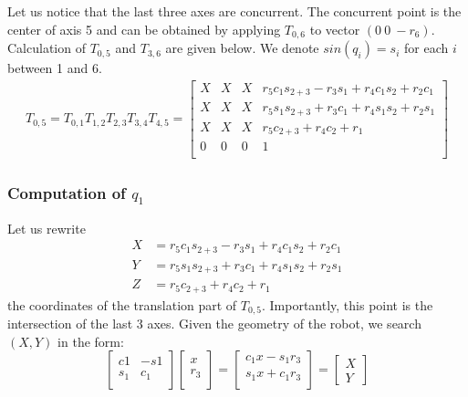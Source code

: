 \documentclass{article}
\begin{document}
Let us notice that the last three axes are concurrent. The concurrent point is the center of axis 5 and can be obtained by applying $T_{0,6}$ to vector $\left(0\ 0\ -r_6\right)$.
Calculation of  $T_{0,5}$ and $T_{3,6}$ are given below. We denote $sin(q_i)=s_i$  for each $i$ between 1 and 6.
\begin{align*}
T_{0,5} = T_{0,1} T_{1,2} T_{2,3} T_{3,4} T_{4,5} =
\begin{bmatrix}
  X & X & X &r_5c_1s_{2+3}-r_3s_1+r_4c_1s_2+r_2c_1\\
  X & X & X & r_5s_1s_{2+3}+r_3c_1+r_4s_1s_2+r_2s_1 \\
  X & X & X & r_5c_{2+3}+r_4c_2+r_1 \\
  0 & 0 & 0 & 1 \\
\end{bmatrix}
\end{align*}

\subsubsection*{Computation of $q_1$}

Let us rewrite
\begin{align*}
  X&=r_5c_1s_{2+3}-r_3s_1+r_4c_1s_2+r_2c_1\\
  Y&=r_5s_1s_{2+3}+r_3c_1+r_4s_1s_2+r_2s_1\\
  Z&=r_5c_{2+3}+r_4c_2+r_1
\end{align*}
the coordinates of the translation part of $T_{0,5}$. Importantly, this point is the intersection of the last 3 axes.
Given the geometry of the robot, we search $(X,Y)$ in the form:
\begin{equation}\label{eq:XY}
  \begin{bmatrix}
    c1 & -s1\\
    s_1 & c_1\\
  \end{bmatrix}
  \begin{bmatrix}
    x\\
    r_3\\
  \end{bmatrix}
  =
  \begin{bmatrix}
    c_1x-s_1r_3\\
    s_1x+c_1r_3\\
  \end{bmatrix}
  =
  \begin{bmatrix}
    X\\Y
  \end{bmatrix}
\end{equation}
\end{document}
